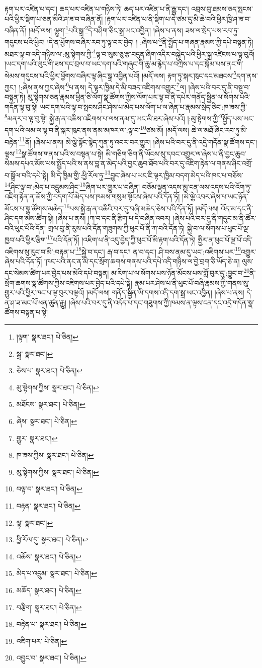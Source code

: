 རྟག་པར་འཛིན་པ་དང་། ཆད་པར་འཛིན་པ་གཉིས་ཏེ། ཆད་པར་འཛིན་པ་ནི་རྒྱུ་དང་། འབྲས་བུ་ཐམས་ཅད་སྤངས་པའི་ཕྱིར་སྡིག་པ་ཅན་མིའི་ཤ་ཟ་བ་བཞིན་ནོ། །རྟག་པར་འཛིན་པ་ནི་སྡིག་པ་དེ་ཙམ་དུ་མི་ཆེ་བའི་ཕྱིར་ཁྱི་ཤ་ཟ་བ་བཞིན་ནོ། །མདོ་ལས། ལྷུག་\footnote{།ལྟག་  སྣར་ཐང་།  པེ་ཅིན། }པའི་སྒྲ་\footnote{སྐྲ་  སྣར་ཐང་། }དེ་བཤིག་ཅིང་སྒྲ་ཡང་འབྱིན། །ཞེས་པ་ནས། ཟས་ལ་སྲེད་པས་རབ་ཏུ་གདུངས་པའི་ཕྱིར། །དེ་ན་ཕྱོགས་བཞིར་རབ་ཏུ་ལྟ་བར་བྱེད། །
:ཞེས་པ་\footnote{ཅེས་པ་  སྣར་ཐང་།  པེ་ཅིན། }ནི་སྤྱོད་པ་གཞན་རྣམས་ཀྱི་དཔེ་བསྟན་ཏེ། མཐར་ལྟ་བ་འདི་གཉིས་ལ་:མུ་སྟེགས་ཀྱི་\footnote{མུ་སྟེགས་ཀྱིས་  སྣར་ཐང་།  པེ་ཅིན། }ལྟ་བ་སུམ་ཅུ་རྩ་བདུན་ཞིག་འདིར་བསྐྱེད་པའི་ཕྱིར་སྐྲ་འཛིངས་པ་ལྟ་བུའོ། །ཡང་དག་པའི་ལུང་གི་ཟས་དང་བྲལ་བ་ཡང་དག་པའི་གཞུང་གི་ཆུ་མ་རྙེད་པ་བཀྲེས་པ་དང་སྐོམ་པས་ནང་གི་སེམས་གདུངས་པའི་ཕྱིར་ཕྱོགས་བཞིར་ལྟ་ཞིང་སྒྲ་འབྱིན་པའོ། །མདོ་ལས། རྟག་ཏུ་སྐར་ཁུང་དང་མཐངས་\footnote{མཐོངས་  སྣར་ཐང་།  པེ་ཅིན། }དག་ནས་ཀྱང་། །:ཞེས་ནས་ཀྱང་ཞེས་\footnote{ཞེས་  སྣར་ཐང་།  པེ་ཅིན། }པ་ནས། དེ་ལྟར་ཁྱིམ་དེ་མི་བཟད་འཇིགས་འགྱུར་\footnote{གྱུར་  སྣར་ཐང་། }ལ། །ཞེས་པའི་བར་དུ་ནི་བསྡུ་བ་བསྟན་ཏེ། མུ་སྟེགས་ཅན་རྣམས་ཕྱིན་ཅི་ལོག་སྣ་ཚོགས་ཀྱིས་ལོག་པར་ལྟ་བ་ནི་དཔེར་གནོད་སྦྱིན་ལ་སོགས་པའི་གདོན་ལྟ་བུ་སྟེ། ཡང་དག་པའི་ལྟ་བ་སྤངས་ཤིང་ཤེས་པ་མེད་པས་ལོག་པ་ལ་ཞེན་པ་རྣམས་སྲེད་ཅིང་:ཁ་ཟས་ཀྱི་\footnote{ཁ་ཟས་ཀྱིས་  སྣར་ཐང་།  པེ་ཅིན། }མནར་བ་ལྟ་བུ་སྟེ། སྐྱེ་རྒ་ན་འཆིས་འཇིགས་པ་ལས་ནམ་དུ་ཡང་མི་ཐར་ཞེས་པའོ། །:མུ་སྟེགས་ཀྱི་\footnote{མུ་སྟེགས་ཀྱིས་  སྣར་ཐང་།  པེ་ཅིན། }སྤྱོད་པས་ཡང་དག་པའི་ལམ་ལ་ལྟ་བ་ནི་སྐར་ཁུང་ནས་ནམ་མཁར་ལ་:ལྟ་བ་\footnote{བལྟ་བ་  སྣར་ཐང་།  པེ་ཅིན། }ཙམ་མོ། །མདོ་ལས། ཆེ་ལ་མཐོ་ཞིང་རབ་ཏུ་མི་བརྟེན་\footnote{བརྟན་  སྣར་ཐང་།  པེ་ཅིན། }ནོ། །ཞེས་པ་ནས། མེ་ལྕེ་སྟོང་སྙེད་ཀུན་ཏུ་འབར་བར་གྱུར། །ཞེས་པའི་བར་དུ་ནི་འདྲེ་གདོན་སྣ་ཚོགས་དང་། ལྟས་\footnote{ལྟ་  སྣར་ཐང་། }སྣ་ཚོགས་གནས་པའི་ས་བསྟན་པ་སྟེ། མི་གཅིག་ཅིག་ནི་ཡོངས་སུ་དབང་འགྱུར་ལ་ཞེས་པ་ནི་བྱང་ཆུབ་སེམས་དཔའ་མོས་པས་སྤྱོད་པའི་ས་ནས་བླ་ན་མེད་པའི་བྱང་ཆུབ་ཐོབ་པའི་བར་དུ་འཇིག་རྟེན་ལ་གནས་ཤིང་འགྲོ་བ་སྒྲོལ་བའི་དཔེ་སྟེ། མི་དེ་ཁྱིམ་གྱི་:ཕྱི་རོལ་ཏུ་\footnote{ཕྱི་རོལ་དུ་  སྣར་ཐང་།  པེ་ཅིན། }བྱུང་ཞེས་པ་ཡང་ཇི་ལྟར་ཁྱིམ་བདག་མེད་པའི་ཁང་པ་བཅོས་\footnote{འཆོས་  སྣར་ཐང་།  པེ་ཅིན། }ཤིང་ལྟ་བ་:མེད་པ་འདྲུམས་ཤིང་\footnote{མེད་པ་འདྲུམ་  སྣར་ཐང་།  པེ་ཅིན། }ཞིག་པར་གྱུར་པ་བཞིན། བཅོམ་ལྡན་འདས་མྱ་ངན་ལས་འདས་པའི་འོག་ཏུ་འཇིག་རྟེན་ན་ཆོས་ཀྱི་བདག་པོ་མེད་པས་ཁམས་གསུམ་སྟོངས་ཞེས་པའི་དོན་ཏོ། །མེ་ལྕེ་འབར་ཞེས་པ་ཡང་ཉོན་མོངས་པ་སྣ་ཚོགས་མཆེད་\footnote{མཆོད་  སྣར་ཐང་།  པེ་ཅིན། }པས་སྐྱེ་རྒ་ན་འཆིའི་བར་དུ་བཞི་མཆེད་ཅེས་པའི་དོན་ཏོ། །མདོ་ལས། འོད་མ་དང་ནི་ཤིང་དག་མེས་ཚིག་སྟེ། །ཞེས་པ་ནས། །ཀ་བ་དང་ནི་རྩིག་པ་དེ་བཞིན་འབར། །ཞེས་པའི་བར་དུ་ནི་གདུང་མ་ནི་ཚོར་བའི་ཕུང་པོའི་དོན། གྲལ་བུ་ནི་རུས་པའི་དོན་གཟུགས་ཀྱི་ཕུང་པོ་ནི་ཀ་བའི་དོན་ཏེ། སྐྱེ་བ་ལ་སོགས་པ་ཕུང་པོ་ལྔ་ཁྱབ་པའི་ཕྱིར་རྩིག་\footnote{བརྩིག་  སྣར་ཐང་།  པེ་ཅིན། }པའི་དོན་ཏོ། །འཇིག་པ་ནི་འདུ་བྱེད་ཀྱི་ཕུང་པོ་མི་རྟག་པའི་དོན་ཏེ། སྤྱིར་ན་ཕུང་པོ་ལྔ་པོ་འདི་འཇིགས་སུ་རུང་བ་མི་:བརྟན་པ་\footnote{བརྟེན་པ་  སྣར་ཐང་།  པེ་ཅིན། }སྐྱེ་བ་དང་། རྒ་བ་དང་། ན་བ་དང་། ཤི་བས་ནམ་དུ་ཡང་:འཇིགས་པར་\footnote{འཇིག་པར་  པེ་ཅིན། }འགྱུར་ཞེས་པའི་དོན་ཏོ། །ཁང་པའི་ནང་ན་མེ་དང་སྲོག་ཆགས་གནས་པའི་དཔེ་འདི་གཉིས་ལ་བྱེ་བྲག་ཅི་ཡོད་ཅེ་ན། ལུས་དང་སེམས་ཚིག་པར་བྱེད་པས་མེའི་དཔེ་བསྟན། མ་རིག་པ་ལ་སོགས་པས་ཉོན་མོངས་པས་གློ་བུར་དུ་:བྱུང་བ་\footnote{འབྱུང་བ་  སྣར་ཐང་།  པེ་ཅིན། }ནི་སྲོག་ཆགས་སྣ་ཚོགས་ཀྱིས་འཇིགས་པར་བྱེད་པའི་དཔེ་སྟེ། རྣམ་པར་ཤེས་པ་ནི་ཕུང་པོ་བཞི་རྣམས་ཀྱི་གནས་སུ་གྱུར་པའི་ཕྱིར་ཁང་པ་ལྟ་བུར་བལྟའོ། །མདོ་ལས། གནོད་སྦྱིན་ཡི་དགས་འདི་དག་སྒྲ་ཡང་འབྱིན། །ཞེས་པ་ནས། དེ་ན་ཤ་ཟ་མང་པོ་ཕན་ཚུན་རྒྱུ། །ཞེས་པའི་བར་དུ་ནི་འདོད་པ་དང་གཟུགས་ཀྱི་ཁམས་ན་ལྟས་ངན་དང་འདྲེ་གདོན་སྣ་ཚོགས་བསྟན་པ་སྟེ། 